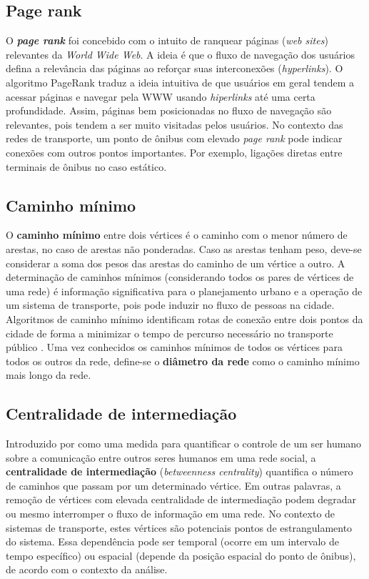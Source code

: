 \subsection{Page rank}

O {\bf \emph{page rank}} foi concebido com o intuito de ranquear páginas (\emph{web sites}) relevantes da \emph{World Wide Web}. A ideia é que o fluxo de navegação dos usuários defina a relevância das páginas ao reforçar suas interconexões (\emph{hyperlinks}). O algoritmo PageRank \cite{brin:98} traduz a ideia intuitiva de que usuários em geral tendem a acessar páginas e navegar pela WWW usando \emph{hiperlinks} até uma certa profundidade. Assim, páginas bem posicionadas no fluxo de navegação são relevantes, pois tendem a ser muito visitadas pelos usuários. No contexto das redes de transporte, um ponto de ônibus com elevado \emph{page rank} pode indicar conexões com outros pontos importantes. Por exemplo, ligações diretas entre terminais de ônibus no caso estático.

\subsection{Caminho mínimo}

O {\bf caminho mínimo} entre dois vértices é o caminho com o menor número de arestas, no caso de arestas não ponderadas. Caso as arestas tenham peso, deve-se considerar a soma dos pesos das arestas do caminho de um vértice a outro. A determinação de caminhos mínimos (considerando todos os pares de vértices de uma rede) é informação significativa para o planejamento urbano e a operação de um sistema de transporte, pois pode induzir no fluxo de pessoas na cidade. Algoritmos de caminho mínimo identificam rotas de conexão entre dois pontos da cidade de forma a minimizar o tempo de percurso necessário no transporte público \cite{Mart:2009, Larson:81}. Uma vez conhecidos os caminhos mínimos de todos os vértices para todos os outros da rede, define-se o {\bf diâmetro da rede} como o caminho mínimo mais longo da rede.

\subsection{Centralidade de intermediação}

Introduzido por \cite{free:77} como uma medida para quantificar o controle de um ser humano sobre a comunicação entre outros seres humanos em uma rede social, a {\bf centralidade de intermediação} (\emph{betweenness centrality}) quantifica o número de caminhos que passam por um determinado vértice. Em outras palavras, a remoção de vértices com elevada centralidade de intermediação podem degradar ou mesmo interromper o fluxo de informação em uma rede. No contexto de sistemas de transporte, estes vértices são potenciais pontos de estrangulamento do sistema. Essa dependência pode ser temporal (ocorre em um intervalo de tempo específico) ou espacial (depende da posição espacial do ponto de ônibus), de acordo com o contexto da análise.




